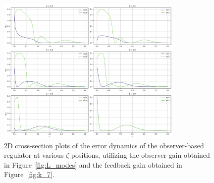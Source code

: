 \begin{figure}[!htbp]
    \centering
    \includegraphics[width=0.8\textwidth]{Figures/2D_et_L_k7.png}
    \caption{2D cross-section plots of the error dynamics of the observer-based regulator at various $\zeta$ positions, utilizing the observer gain obtained in Figure~\ref{fig:L_modes} and the feedback gain obtained in Figure~\ref{fig:k_7}.}
    \label{fig:2D_et_L_k7}
\end{figure}
